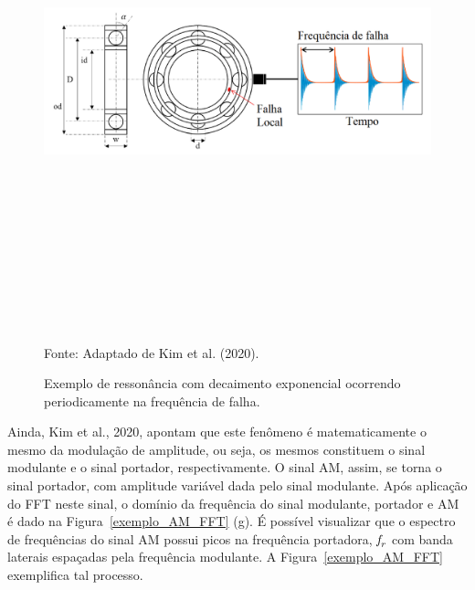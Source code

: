 \documentclass[
	12pt,				
	oneside,			
	a4paper,			
	english,			
	brazil,	
	sumario=abnt-6027-2012		
	]{abntex2ppgsi}
\newcommand{\f}{\mkern-2mu f\mkern-3mu}
\begin{document}
\begin{figure}[!htb]
\centering
\caption {Exemplo de ressonância com decaimento exponencial ocorrendo periodicamente na frequência de falha.}
\includegraphics[width=\textwidth,height=150mm,keepaspectratio]{exemplo_ressonancia_falha} \\
Fonte: Adaptado de Kim et al. (2020).
\label{exemplo_ressonancia_falha}
\end{figure}

Ainda, Kim et al., 2020, apontam que este fenômeno é matematicamente o mesmo da modulação de amplitude, ou seja, os mesmos constituem o sinal modulante e o sinal portador, respectivamente. O sinal AM, assim, se torna o sinal portador, com amplitude variável dada pelo sinal modulante. Após aplicação do FFT neste sinal, o domínio da frequência do sinal modulante, portador e AM é dado na Figura~\ref{exemplo_AM_FFT} (g). É possível visualizar que o espectro de frequências do sinal AM possui picos na frequência portadora, ${\f}_r$ com banda laterais espaçadas pela frequência modulante. A Figura~\ref{exemplo_AM_FFT} exemplifica tal processo. 
\end{document}
